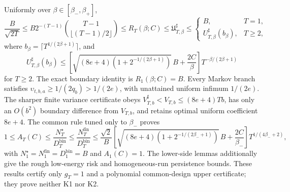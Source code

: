 Uniformly over \(\beta\in[\beta_-,\beta_+]\),
\[
\frac{B}{\sqrt{2T}}\le B2^{-(T-1)}\binom{T-1}{\lfloor(T-1)/2\rfloor}\le R_T(\beta;C)\le\mathfrak U_{T,\beta}^{\sharp}\le\begin{cases}B,&T=1,\\ U_{T,\beta}^{\sharp}(b_\beta),&T\ge2,\end{cases}
\]
where \(b_\beta=\lceil T^{1/(2\beta+1)}\rceil\), and
\[
U_{T,\beta}^{\sharp}(b_\beta)\le\left[\sqrt{(8e+4)\left(1+2^{-1/(2\beta+1)}\right)}\,B+\frac{2C}{\beta}\right]T^{-\beta/(2\beta+1)}
\]
for \(T\ge2\). The exact boundary identity is \(R_1(\beta;C)=B\). Every Markov branch satisfies \(\upsilon_{t,b,a}\ge1/(2q_b)>1/(2e)\), with unattained uniform infimum \(1/(2e)\). The sharper finite variance certificate obeys \(V_{T,b}^{\sharp}<V_{T,b}\le(8e+4)Tb\), has only an \(O(b^2)\) boundary difference from \(V_{T,b}\), and retains optimal uniform coefficient \(8e+4\). The common rule tuned only to \(\beta_-\) proves
\[
1\le A_T(C)\le\frac{N_T^\star}{D_T^{\mathrm{bin}}}\le\frac{N_T^{\mathrm{fin}}}{D_T^{\mathrm{bin}}}\le\frac{\sqrt2}{B}\left[\sqrt{(8e+4)\left(1+2^{-1/(2\beta_-+1)}\right)}\,B+\frac{2C}{\beta_-}\right]T^{1/(4\beta_-+2)},
\]
with \(N_1^\star=N_1^{\mathrm{fin}}=D_1^{\mathrm{bin}}=B\) and \(A_1(C)=1\). The lower-side lemmas additionally give the rough low-energy risk and homogeneous-run persistence bounds. These results certify only \(g_T=1\) and a polynomial common-design upper certificate; they prove neither K1 nor K2.